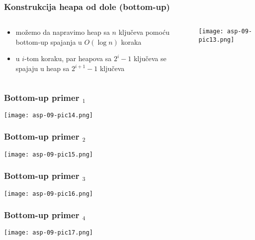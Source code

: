 \documentclass[compress,aspectratio=169]{beamer}
\begin{document}
\begin{frame}[fragile]
  \frametitle{Konstrukcija heapa od dole (bottom-up)}
  \begin{columns}
    \begin{column}[c]{6cm}
      \begin{itemize}
        \item možemo da napravimo heap sa $n$ ključeva pomoću bottom-up
        spajanja u $O(\log n)$ koraka
        \item u $i$-tom koraku, par heapova sa $2^i-1$ ključeva se spajaju u
        heap sa $2^{i+1}-1$ ključeva
        \end{itemize}
    \end{column}
    \begin{column}[c]{5cm}
      \begin{center}
        \texttt{[image: asp-09-pic13.png]}
      \end{center}
    \end{column}
  \end{columns}
\end{frame}

\begin{frame}[fragile]
  \frametitle{Bottom-up primer $_1$}
  \begin{center}
    \texttt{[image: asp-09-pic14.png]}
  \end{center}
\end{frame}

\begin{frame}[fragile]
  \frametitle{Bottom-up primer $_2$}
  \begin{center}
    \texttt{[image: asp-09-pic15.png]}
  \end{center}
\end{frame}

\begin{frame}[fragile]
  \frametitle{Bottom-up primer $_3$}
  \begin{center}
    \texttt{[image: asp-09-pic16.png]}
  \end{center}
\end{frame}

\begin{frame}[fragile]
  \frametitle{Bottom-up primer $_4$}
  \begin{center}
    \texttt{[image: asp-09-pic17.png]}
  \end{center}
\end{frame}
\end{document}
